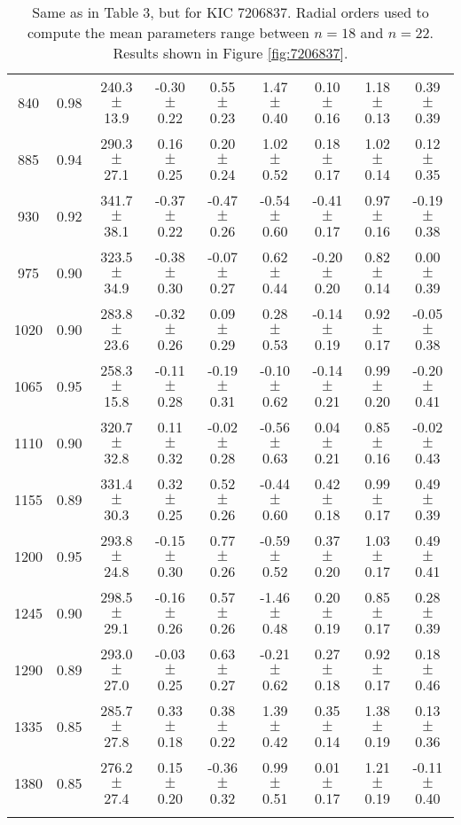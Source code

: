\documentclass[twocolumn]{aastex61}%
\begin{document}
\begin{table*}[ht]
\begin{tabular}{ccc|ccccc|c}
840 & 0.98 & 240.3 $\pm$ 13.9 & -0.30 $\pm$ 0.22 & 0.55 $\pm$ 0.23 & 1.47 $\pm$ 0.40 & 0.10 $\pm$ 0.16 & 1.18 $\pm$ 0.13 & 0.39 $\pm$ 0.39\\
885 & 0.94 & 290.3 $\pm$ 27.1 & 0.16 $\pm$ 0.25 & 0.20 $\pm$ 0.24 & 1.02 $\pm$ 0.52 & 0.18 $\pm$ 0.17 & 1.02 $\pm$ 0.14 & 0.12 $\pm$ 0.35\\
930 & 0.92 & 341.7 $\pm$ 38.1 & -0.37 $\pm$ 0.22 & -0.47 $\pm$ 0.26 & -0.54 $\pm$ 0.60 & -0.41 $\pm$ 0.17 & 0.97 $\pm$ 0.16 & -0.19 $\pm$ 0.38\\
975 & 0.90 & 323.5 $\pm$ 34.9 & -0.38 $\pm$ 0.30 & -0.07 $\pm$ 0.27 & 0.62 $\pm$ 0.44 & -0.20 $\pm$ 0.20 & 0.82 $\pm$ 0.14 & 0.00 $\pm$ 0.39\\
1020 & 0.90 & 283.8 $\pm$ 23.6 & -0.32 $\pm$ 0.26 & 0.09 $\pm$ 0.29 & 0.28 $\pm$ 0.53 & -0.14 $\pm$ 0.19 & 0.92 $\pm$ 0.17 & -0.05 $\pm$ 0.38\\
1065 & 0.95 & 258.3 $\pm$ 15.8 & -0.11 $\pm$ 0.28 & -0.19 $\pm$ 0.31 & -0.10 $\pm$ 0.62 & -0.14 $\pm$ 0.21 & 0.99 $\pm$ 0.20 & -0.20 $\pm$ 0.41\\
1110 & 0.90 & 320.7 $\pm$ 32.8 & 0.11 $\pm$ 0.32 & -0.02 $\pm$ 0.28 & -0.56 $\pm$ 0.63 & 0.04 $\pm$ 0.21 & 0.85 $\pm$ 0.16 & -0.02 $\pm$ 0.43\\
1155 & 0.89 & 331.4 $\pm$ 30.3 & 0.32 $\pm$ 0.25 & 0.52 $\pm$ 0.26 & -0.44 $\pm$ 0.60 & 0.42 $\pm$ 0.18 & 0.99 $\pm$ 0.17 & 0.49 $\pm$ 0.39\\
1200 & 0.95 & 293.8 $\pm$ 24.8 & -0.15 $\pm$ 0.30 & 0.77 $\pm$ 0.26 & -0.59 $\pm$ 0.52 & 0.37 $\pm$ 0.20 & 1.03 $\pm$ 0.17 & 0.49 $\pm$ 0.41\\
1245 & 0.90 & 298.5 $\pm$ 29.1 & -0.16 $\pm$ 0.26 & 0.57 $\pm$ 0.26 & -1.46 $\pm$ 0.48 & 0.20 $\pm$ 0.19 & 0.85 $\pm$ 0.17 & 0.28 $\pm$ 0.39\\
1290 & 0.89 & 293.0 $\pm$ 27.0 & -0.03 $\pm$ 0.25 & 0.63 $\pm$ 0.27 & -0.21 $\pm$ 0.62 & 0.27 $\pm$ 0.18 & 0.92 $\pm$ 0.17 & 0.18 $\pm$ 0.46\\
1335 & 0.85 & 285.7 $\pm$ 27.8 & 0.33 $\pm$ 0.18 & 0.38 $\pm$ 0.22 & 1.39 $\pm$ 0.42 & 0.35 $\pm$ 0.14 & 1.38 $\pm$ 0.19 & 0.13 $\pm$ 0.36\\
1380 & 0.85 & 276.2 $\pm$ 27.4 & 0.15 $\pm$ 0.20 & -0.36 $\pm$ 0.32 & 0.99 $\pm$ 0.51 & 0.01 $\pm$ 0.17 & 1.21 $\pm$ 0.19 & -0.11 $\pm$ 0.40\\\vspace{-0.3cm}
\end{tabular}
\caption{Same as in Table 3, but for KIC 7206837. Radial orders used to compute the mean parameters range between $n=18$ and $n=22$. Results shown in Figure \ref{fig:7206837}.}\label{tab:7206837}\vspace{-2cm}
\end{table*}
\end{document}
